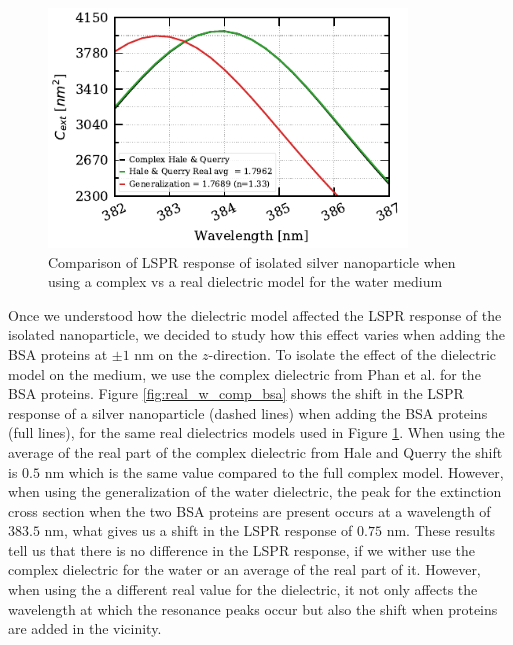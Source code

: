\begin{figure} %
    \centering
    \includegraphics[width=0.85\textwidth]{iso_np_water_diel_study.pdf} 
    \caption{Comparison of LSPR response of isolated silver nanoparticle when using a complex 
     vs a real dielectric model for the water medium}
    \label{fig:iso_NP_diel}
 \end{figure}

Once we understood how the dielectric model affected the LSPR response of the isolated nanoparticle, we decided to study how this 
effect varies when adding the BSA proteins at $\pm1$ nm on the $z$-direction. To isolate the effect of the dielectric model on the 
medium, we use the complex dielectric from Phan et al. \cite{PhanETal2013} for the BSA proteins. Figure \ref{fig:real_w_comp_bsa}
shows the shift in the LSPR response of a silver nanoparticle (dashed lines) when adding the BSA proteins (full lines), for the same 
real dielectrics models used in Figure \ref{fig:iso_NP_diel}. When using the average of the real part of the complex dielectric from 
Hale and Querry \cite{HaleQuerry1972} the shift is $0.5$ nm which is the same value compared to the full complex model. However, when using 
the generalization of the water dielectric, the peak for the extinction cross section when the two BSA proteins are present occurs at a wavelength of 
$383.5$ nm, what gives us a shift in the LSPR response of $0.75$ nm. These results tell us that there is no difference in the LSPR response, if we wither use 
the complex dielectric for the water or an average of the real part of it. However, when using the a different real value for the dielectric, it not only 
affects the wavelength at which the resonance peaks occur but also the shift when proteins are added in the vicinity. 

